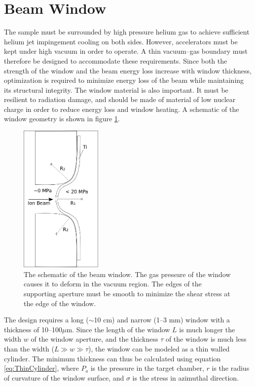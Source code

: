 \documentclass[final,3p,times,twocolumn]{elsarticle} %
\begin{document}
\section{Beam Window}

The sample must be surrounded by high pressure helium gas to achieve sufficient helium jet impingement cooling on both sides. However, accelerators must be kept under high vacuum in order to operate.  A thin vacuum--gas boundary must therefore be designed to accommodate these requirements.  Since both the strength of the window and the beam energy loss increase with window thickness, optimization is required to minimize energy loss of the beam while maintaining its structural integrity.  The window material is also important.  It must be resilient to radiation damage, and should be made of material of low nuclear charge in order to reduce energy loss and window heating.  A schematic of the window geometry is shown in figure \ref{fig:Window}.


\begin{figure}[htbp]
\begin{center}
\includegraphics[width=40mm]{Figures/WindowSchematic.png}
\caption{The schematic of the beam window. The gas pressure of the window causes it to deform in the vacuum region. The edges of the supporting aperture must be smooth to minimize the shear stress at the edge of the window.}
\label{fig:Window}
\end{center}
\end{figure}

The design requires a long ($\sim$10 cm) and narrow  (1--3 mm)  window with a thickness of 10--100$\mu$m.  Since the length of the window $L$ is much longer the width $w$ of the window aperture, and the thickness $\tau$ of the window is much less than the width ($L \gg w \gg \tau$), the window can be modeled as a thin walled cylinder. The minimum thickness can thus be calculated using equation \ref{eq:ThinCylinder}, where $P_o$ is the pressure in the target chamber, $r$ is the radius of curvature of the window surface, and $\sigma$ is the stress in azimuthal direction.  
\end{document}
